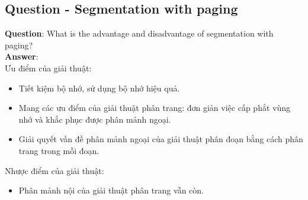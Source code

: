 \documentclass[10pt]{article}
\newcommand\tab[1][1cm]{\hspace*{#1}}
\begin{document}
\subsection{Question - Segmentation with paging}
\textbf{Question}: What is the advantage and disadvantage of segmentation with paging? \\
\textbf{Answer}: \\
\tab[0.5cm] Ưu điểm của giải thuật:
\begin{itemize}
    \item Tiết kiệm bộ nhớ, sử dụng bộ nhớ hiệu quả.
    \item Mang các ưu điểm của giải thuật phân trang: đơn giản việc cấp phắt vùng nhớ và khắc phục được phân mảnh ngoại.
    \item Giải quyết vấn đề phân mảnh ngoại của giải thuật phân đoạn bằng cách phân trang trong mỗi đoạn.
\end{itemize} 
\tab[0.5cm] Nhược điểm của giải thuật:
\begin{itemize}
    \item Phân mảnh nội của giải thuật phân trang vẫn còn.
\end{itemize}
\end{document}
